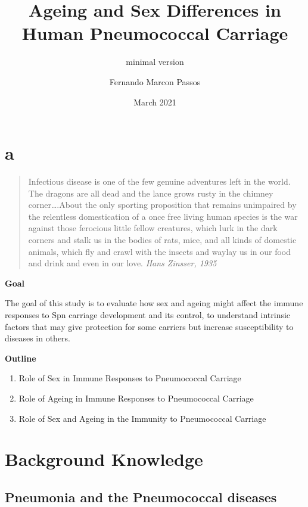 \documentclass[
]{book}
\title{Ageing and Sex Differences in Human Pneumococcal Carriage}
\subtitle{minimal version}
\author{Fernando Marcon Passos}
\date{March 2021}
\begin{document}
\maketitle

{
\setcounter{tocdepth}{1}
\tableofcontents
}
\hypertarget{a}{%
\chapter*{a}\label{a}}

\begin{quote}
Infectious disease is one of the few genuine adventures left in the world. The dragons are all dead and the lance grows rusty in the chimney corner\ldots.About the only sporting proposition that remains unimpaired by the relentless domestication of a once free living human species is the war against those ferocious little fellow creatures, which lurk in the dark corners and stalk us in the bodies of rats, mice, and all kinds of domestic animals, which fly and crawl with the insects and waylay us in our food and drink and even in our love. \emph{Hans Zinsser, 1935}
\end{quote}

\textbf{Goal}

The goal of this study is to evaluate how sex and ageing might affect the immune responses to Spn carriage development and its control, to understand intrinsic factors that may give protection for some carriers but increase susceptibility to diseases in others.

\textbf{Outline}

\begin{enumerate}
\def\labelenumi{\arabic{enumi}.}
\item
  Role of Sex in Immune Responses to Pneumococcal Carriage
\item
  Role of Ageing in Immune Responses to Pneumococcal Carriage
\item
  Role of Sex and Ageing in the Immunity to Pneumococcal Carriage
\end{enumerate}

\hypertarget{intro}{%
\chapter{Background Knowledge}\label{intro}}

\hypertarget{pneumonia-and-the-pneumococcal-diseases}{%
\section{Pneumonia and the Pneumococcal diseases}\label{pneumonia-and-the-pneumococcal-diseases}}
\end{document}
